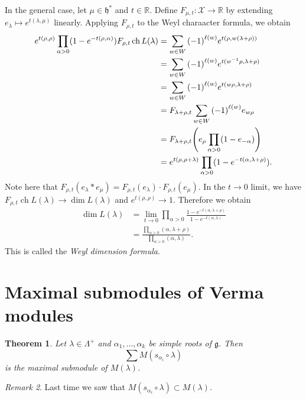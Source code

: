 \documentclass[leqno, openany]{memoir}
\newtheorem{thm}{Theorem}[section]
\theoremstyle{definition}
\theoremstyle{remark}
\newtheorem{rmk}[thm]{Remark}
\theoremstyle{plain}
\theoremstyle{definition}
\theoremstyle{remark}
\newcommand{\R}{\mathbb{R}}
\newcommand{\g}{\mathfrak{g}}
\newcommand{\h}{\mathfrak{h}}
\newcommand{\mc}[1]{\mathcal{#1}}
\DeclareMathOperator{\ch}{ch}
\begin{document}
In the general case, let $\mu \in \h^*$ and $t \in \R$. Define $F_{\mu, t} \colon \mc{X} \to \R$ by extending $e_{\lambda} \mapsto e^{t(\lambda, \mu)}$ linearly. Applying $F_{\rho, t}$ to the Weyl charaacter formula, we obtain
\begin{align*}
    e^{t(\rho, \rho)} \prod_{\alpha > 0} (1-e^{-t(\rho, \alpha)}) F_{\rho, t} \ch L(\lambda) &= \sum_{w \in W} {(-1)}^{\ell(w)} e^{t(\rho, w(\lambda + \rho))} \\
    &= \sum_{w \in W} {(-1)}^{\ell(w)} e^{t (w^{-1} \rho, \lambda + \rho)} \\
    &= \sum_{w \in W} {(-1)}^{\ell(w)} e^{t(w \rho, \lambda + \rho)} \\
    &= F_{\lambda + \rho, t} \sum_{w \in W} {(-1)}^{\ell(w)} e_{w \rho} \\
    &= F_{\lambda + \rho, t} \qty(e_{\rho} \prod_{\alpha > 0} (1-e_{-\alpha})) \\
    &= e^{t(\rho, \rho + \lambda)} \prod_{\alpha > 0} (1-e^{- t(\alpha, \lambda + \rho)}).
\end{align*}
Note here that $F_{\rho, t}(e_{\lambda} * e_{\mu}) = F_{\rho, t} (e_{\lambda}) \cdot F_{\rho, t} (e_{\mu})$. In the $t \to 0$ limit, we have $F_{\rho, t} \ch L(\lambda) \to \dim L(\lambda)$ and $e^{t(\rho, \rho)} \to 1$. Therefore we obtain
\begin{align*}
    \dim L(\lambda) &= \lim_{t \to 0} \prod_{\alpha > 0} \frac{1-e^{-t(\alpha, \lambda + \rho)}}{1-e^{-t(\alpha, \lambda)}} \\
    &= \frac{\prod_{\alpha > 0} (\alpha, \lambda + \rho)}{\prod_{\alpha > 0} (\alpha, \lambda)}.
\end{align*}
This is called the \textit{Weyl dimension formula}.

\section{Maximal submodules of Verma modules}%
\label{sec:maximal_submodules_of_verma_modules}

\begin{thm}
    Let $\lambda \in \Lambda^+$ and $\alpha_1, \ldots, \alpha_k$ be simple roots of $\g$. Then 
    \[ \sum M(s_{\alpha_i} \circ \lambda) \]
    is the maximal submodule of $M(\lambda)$.
\end{thm}

\begin{rmk}
    Last time we saw that $M(s_{\alpha_i} \circ \lambda) \subset M(\lambda)$.
\end{rmk}
\end{document}
